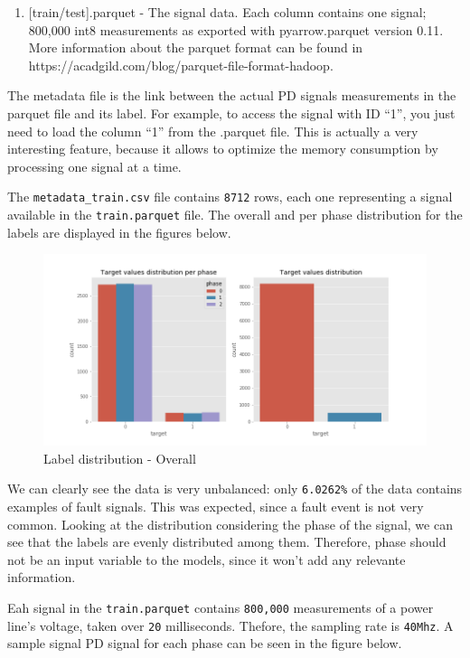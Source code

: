 \documentclass[11pt]{article}
\makeatletter
\def\maxwidth{\ifdim\Gin@nat@width>\linewidth\linewidth
    \else\Gin@nat@width\fi}
\let\Oldincludegraphics\includegraphics
\renewcommand{\includegraphics}[1]{\Oldincludegraphics[width=.8\maxwidth]{#1}}
\providecommand{\tightlist}{%
      \setlength{\itemsep}{0pt}\setlength{\parskip}{0pt}}
\makeatother
\begin{document}
\begin{enumerate}
\def\labelenumi{\alph{enumi})}
\setcounter{enumi}{1}
\tightlist
\item
  {[}train/test{]}.parquet - The signal data. Each column contains one
  signal; 800,000 int8 measurements as exported with pyarrow.parquet
  version 0.11. More information about the parquet format can be found
  in https://acadgild.com/blog/parquet-file-format-hadoop.
\end{enumerate}

The metadata file is the link between the actual PD signals measurements
in the parquet file and its label. For example, to access the signal
with ID ``1'', you just need to load the column ``1'' from the .parquet
file. This is actually a very interesting feature, because it allows to
optimize the memory consumption by processing one signal at a time.

The \texttt{metadata\_train.csv} file contains \texttt{8712} rows, each
one representing a signal available in the \texttt{train.parquet} file.
The overall and per phase distribution for the labels are displayed in
the figures below.

\begin{figure}
\centering
\includegraphics{train_data_dist_twosided.png}
\caption{Label distribution - Overall}
\end{figure}

We can clearly see the data is very unbalanced: only \texttt{6.0262\%}
of the data contains examples of fault signals. This was expected, since
a fault event is not very common. Looking at the distribution
considering the phase of the signal, we can see that the labels are
evenly distributed among them. Therefore, phase should not be an input
variable to the models, since it won't add any relevante information.

Eah signal in the \texttt{train.parquet} contains \texttt{800,000}
measurements of a power line's voltage, taken over \texttt{20}
milliseconds. Thefore, the sampling rate is \texttt{40Mhz}. A sample
signal PD signal for each phase can be seen in the figure below.
\end{document}

